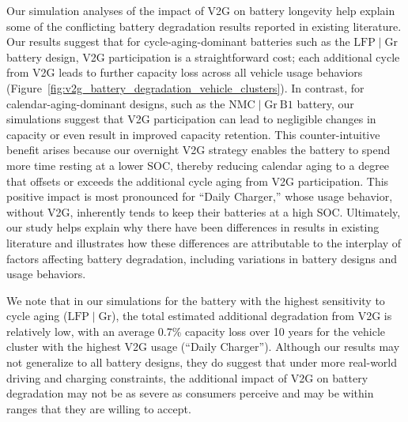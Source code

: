 \documentclass[pdflatex,sn-nature]{sn-jnl}%
\theoremstyle{thmstyleone}%
\theoremstyle{thmstyletwo}%
\theoremstyle{thmstylethree}%
\begin{document}
Our simulation analyses of the impact of V2G on battery longevity help explain some of the conflicting battery degradation results reported in existing literature. Our results suggest that for cycle-aging-dominant batteries such as the $\mathrm{LFP}\mid\mathrm{Gr}$ battery design, V2G participation is a straightforward cost; each additional cycle from V2G leads to further capacity loss across all vehicle usage behaviors (Figure~\ref{fig:v2g_battery_degradation_vehicle_clusters}). In contrast, for calendar-aging-dominant designs, such as the $\mathrm{NMC}\mid\mathrm{Gr~B1}$ battery, our simulations suggest that V2G participation can lead to negligible changes in capacity or even result in improved capacity retention. This counter-intuitive benefit arises because our overnight V2G strategy enables the battery to spend more time resting at a lower SOC, thereby reducing calendar aging to a degree that offsets or exceeds the additional cycle aging from V2G participation. This positive impact is most pronounced for ``Daily Charger,'' whose usage behavior, without V2G, inherently tends to keep their batteries at a high SOC. Ultimately, our study helps explain why there have been differences in results in existing literature and illustrates how these differences are attributable to the interplay of factors affecting battery degradation, including variations in battery designs and usage behaviors.

We note that in our simulations for the battery with the highest sensitivity to cycle aging ($\mathrm{LFP}\mid\mathrm{Gr}$), the total estimated additional degradation from V2G is relatively low, with an average 0.7\% capacity loss over 10 years for the vehicle cluster with the highest V2G usage (``Daily Charger''). Although our results may not generalize to all battery designs, they do suggest that under more real-world driving and charging constraints, the additional impact of V2G on battery degradation may not be as severe as consumers perceive and may be within ranges that they are willing to accept. 
\end{document}
